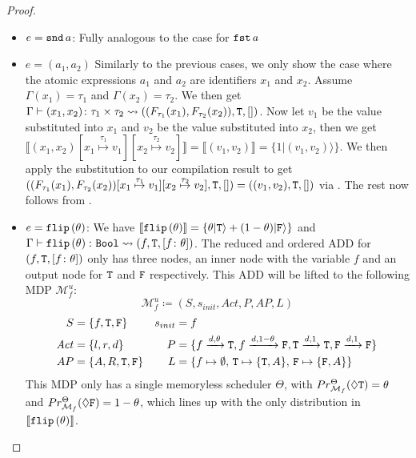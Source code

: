 \begin{proof}
\begin{itemize}
		
		\item $e = \texttt{snd}\, a$: Fully analogous to the case for $\texttt{fst}\, a$\\
		
		
		\item $e =(a_1, a_2)$ Similarly to the previous cases, we only show the case where the atomic expressions $a_1$ and $a_2$ are identifiers $x_1$ and $x_2$. 
		Assume $\Gamma(x_1) = \tau_1$ and $\Gamma(x_2) = \tau_2$. 
		We then get $\Gamma \vdash (x_1, x_2) \colon \tau_1 \times \tau_2 \leadsto ((F_{\tau_1}(x_1), F_{\tau_2}(x_2)) , \texttt{T}, [])$.
		Now let $v_1$ be the value substituted into $x_1$ and $v_2$ be the value substituted into $x_2$, then we get $\llbracket (x_1, x_2)[x_1 \overset{\tau_1}{\mapsto} v_1][x_2 \overset{\tau_2}{\mapsto} v_2] \rrbracket = \llbracket( v_1, v_2)\rrbracket = \{1|( v_1, v_2)\rangle\}$.
		We then apply the substitution to our compilation result to get $((F_{\tau_1}(x_1), F_{\tau_2}(x_2))[x_1 \overset{\tau_1}{\mapsto} v_1][x_2 \overset{\tau_2}{\mapsto} v_2], \texttt{T}, []) = ((v_1, v_2), \texttt{T}, [])$  via . 
		The rest now follows from .\\
		
		
		\item $e =\texttt{flip} \left(\theta\right) $: We have $\llbracket \texttt{flip} \left(\theta\right)  \rrbracket = \{\theta|\texttt{T}\rangle + (1-\theta)|\texttt{F}\rangle\}$ and $\Gamma \vdash \texttt{flip} \left(\theta\right)  \colon \texttt{Bool} \leadsto (f, \texttt{T}, [f\colon \theta])$. 
		The reduced and ordered ADD for $(f, \texttt{T}, [f\colon \theta])$ only has three nodes, an inner node with the variable $f$ and an output node for $\texttt{T}$ and $\texttt{F}$ respectively. This ADD will be lifted to the following MDP $\mathcal{M}^u_f$:
		$$\mathcal{M}^u_f \coloneqq (S, s_{init}, \mathit{Act}, P, AP, L)$$
		\begin{align*}
			S &=  \{f, \texttt{T}, \texttt{F}\} & s_{init} &= f \\
			\mathit{Act} &= \{l,r,d\} & P &= \{f\xrightarrow{d,\theta}\texttt{T}, f\xrightarrow{d,1 - \theta}\texttt{F}, \texttt{T}\xrightarrow{d,1}\texttt{T}, \texttt{F} \xrightarrow{d,1}\texttt{F}\} \\
			AP &= \{A,R, \texttt{T}, \texttt{F}\} & L &= \{f \mapsto \emptyset,\, \texttt{T} \mapsto \{\texttt{T}, A\},\, \texttt{F} \mapsto \{\texttt{F}, A\}\}
		\end{align*}
		This MDP only has a single memoryless scheduler $\Theta$, with $Pr^\Theta_{\mathcal{M}_f}(\lozenge \texttt{T}) = \theta$ and $Pr^\Theta_{\mathcal{M}_f}(\lozenge \texttt{F}) = 1 - \theta$, which lines up with the only distribution in $\llbracket \texttt{flip} \left(\theta\right)  \rrbracket$.\\
		

\end{itemize}
\end{proof}
